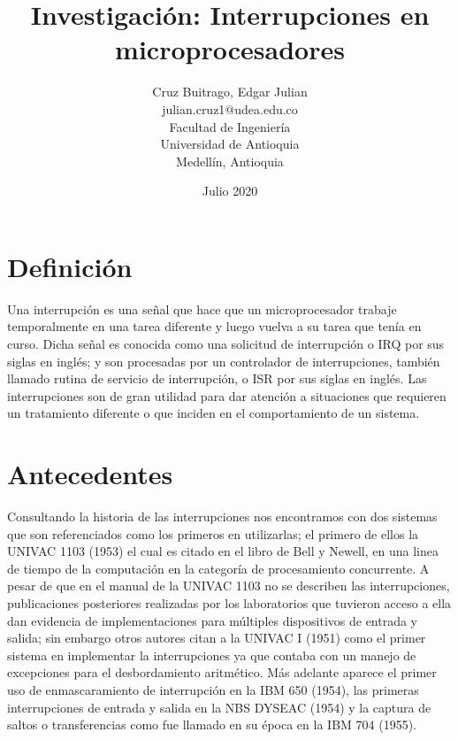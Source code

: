 \documentclass[]{article}
\title{Investigación: Interrupciones en microprocesadores}
\author{Cruz Buitrago, Edgar Julian \\ julian.cruz1@udea.edu.co \\ Facultad de Ingeniería \\ Universidad de Antioquia \\ Medellín, Antioquia}
\date{Julio 2020}
\begin{document}
\maketitle
\begin{multicols}{2}
	\begin{abstract}		
		
	\end{abstract}
	
	\section{Definición}
		Una interrupción es una señal que hace que un microprocesador trabaje temporalmente en una tarea diferente y luego vuelva a su tarea que tenía en curso.\cite{wikibooks}  Dicha señal es conocida como una solicitud de interrupción o IRQ por sus siglas en inglés; y son procesadas por un controlador de interrupciones, también llamado rutina de servicio de interrupción, o ISR por sus siglas en inglés.\cite{techterms}  Las interrupciones son de gran utilidad para dar atención a situaciones que requieren un tratamiento diferente o que inciden en el comportamiento de un sistema.
	\section{Antecedentes}
		Consultando la historia de las interrupciones nos encontramos con dos sistemas que son referenciados como los primeros en utilizarlas; el primero de ellos la UNIVAC 1103 (1953) el cual es citado en el libro de Bell y Newell, en una linea de tiempo de la computación en la categoría de procesamiento concurrente\cite{history2}.  A pesar de que en el manual de la UNIVAC 1103\cite{history3} no se describen las interrupciones, publicaciones posteriores realizadas por los laboratorios que tuvieron acceso a ella dan evidencia de implementaciones para múltiples dispositivos de entrada y salida; sin embargo otros autores citan a la UNIVAC I (1951) como el primer sistema en implementar la interrupciones ya que contaba con un manejo de excepciones para el desbordamiento aritmético.  Más adelante aparece el primer uso de enmascaramiento de interrupción en la IBM 650 (1954), las primeras interrupciones de entrada y salida en la NBS DYSEAC (1954) y la captura de saltos o transferencias como fue llamado en su época en la IBM 704 (1955).\cite{history}

\end{multicols}
\end{document}
